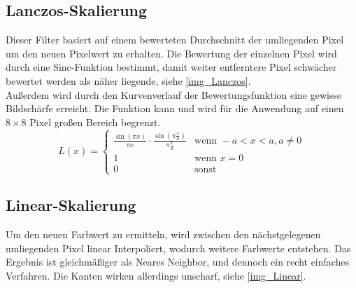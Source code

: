 \subsection{Lanczos-Skalierung}
Dieser Filter basiert auf einem bewerteten Durchschnitt der umliegenden Pixel um den neuen Pixelwert zu erhalten. Die Bewertung der einzelnen Pixel wird durch eine Sinc-Funktion bestimmt, damit weiter entferntere Pixel schwächer bewertet werden als näher liegende, siehe \autoref{img_Lanczos}.\\
Außerdem wird durch den Kurvenverlauf der Bewertungsfunktion eine gewisse Bildschärfe erreicht. Die Funktion kann und wird für die Anwendung auf einen $8\times 8$ Pixel großen Bereich begrenzt.\\
\cite{wiki_Lanczos}
\[ L(x)= \left\{ \begin{array}{ll}
\frac{\sin(\pi x)}{\pi x} \cdot \frac{\sin(\pi \frac{x}{a})}{\pi \frac{x}{a}} & \textrm{wenn } -a < x <a, a\ne 0\\
1 & \textrm{wenn } x = 0\\
0 & \textrm{sonst}
\end{array}\right. \]
\subsection{Linear-Skalierung}
Um den neuen Farbwert zu ermitteln, wird zwischen den nächstgelegenen umliegenden Pixel linear Interpoliert, wodurch weitere Farbwerte entstehen. Das Ergebnis ist gleichmäßiger als Neares Neighbor, und dennoch ein recht einfaches Verfahren. Die Kanten wirken allerdings unscharf, siehe \autoref{img_Linear}.
